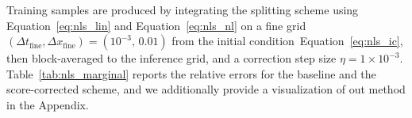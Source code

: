 \documentclass[letterpaper]{article} %
\def\Eqref#1{Equation~\ref{#1}}
\providecommand{\Eqref}[1]{\Cref{#1}}
\begin{document}
Training samples are produced by integrating the splitting
scheme using \Eqref{eq:nls_lin} and \Eqref{eq:nls_nl} on a fine grid
$(\Delta t_{\mathrm{fine}}, \Delta x_{\mathrm{fine}}) = (10^{-3},\,0.01)$
from the initial condition~\Eqref{eq:nls_ic}, then
block-averaged to the inference grid, 
and a correction step size $\eta = 1{\times}10^{-3}$.
Table~\ref{tab:nls_marginal} reports the relative errors for
the baseline and the score-corrected scheme, and we additionally provide a visualization of out method in the Appendix.





\end{document}

